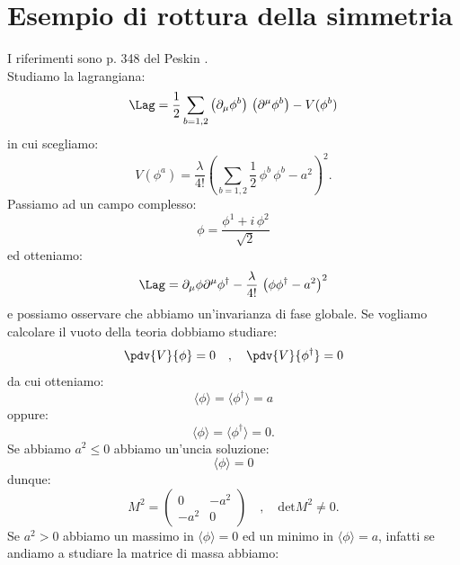 \section{Esempio di rottura della simmetria}

I riferimenti sono p. 348 del Peskin \cite{Peskin}. \\

Studiamo la lagrangiana:
\begin{equation}
    \Lag = \frac{1}{2}\sum_{b=1,2}\left(\partial_\mu\phi^b\right)\, \left(\partial^\mu\phi^b\right) - V(\phi^b) 
\end{equation}
in cui scegliamo:
\begin{equation}
    V(\phi^a) = \frac{\lambda}{4!}\left( \sum_{b=1,2}\frac{1}{2}\, \phi^b\, \phi^b - a^2 \right)^2.
\end{equation}
Passiamo ad un campo complesso:
\begin{equation}
    \phi = \frac{\phi^1 + i\, \phi^2}{\sqrt{2}}
\end{equation}
ed otteniamo:
\begin{equation}
    \Lag = \partial_\mu\phi\partial^\mu\phi^\dagger - \frac{\lambda}{4!}\, \left( \phi\phi^\dagger - a^2 \right)^2
    \label{eqn:5 lag con esempio rottura simm}
\end{equation}
e possiamo osservare che abbiamo un'invarianza di fase globale. Se vogliamo calcolare il vuoto della teoria dobbiamo studiare:
\begin{equation}
    \pdv{V}{\phi} = 0 \quad , \quad \pdv{V}{\phi^\dagger} = 0
\end{equation}
da cui otteniamo:
\begin{equation}
    \langle \phi \rangle = \langle \phi^\dagger \rangle = a
\end{equation}
oppure:
\begin{equation}
    \langle \phi \rangle = \langle \phi^\dagger \rangle = 0.
\end{equation}
Se abbiamo $a^2\leq 0$ abbiamo un'uncia soluzione:
\begin{equation}
    \langle \phi \rangle = 0
\end{equation}
dunque:
\begin{equation}
    M^2 = \begin{pmatrix}
        0 & -a^2 \\
        -a^2 & 0
    \end{pmatrix} \quad , \quad \text{det}M^2 \neq 0.
\end{equation}
Se $a^2>0$ abbiamo un massimo in $\langle \phi \rangle = 0$ ed un minimo in $\langle \phi \rangle = a$, infatti se andiamo a studiare la matrice di massa abbiamo:
